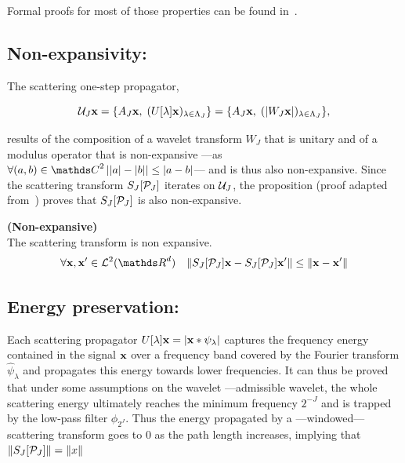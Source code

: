 \documentclass[a4paper,11pt]{report}
\begin{document}
		\begin{note}
		  Formal proofs for most of those properties can be found in~\citep{mallat2012gis}.
		\end{note}

		\subsection{Non-expansivity:}
			\label{subsec:ST/Pties/Non-expansivity}
			The scattering one-step propagator,
			
			\begin{equation*}
			  \mathcal{U}_{J} {\bf x} = \{ A_{J}{\bf x} , \; (U[\lambda]{\bf x})_{\lambda \in \Lambda_{J}} \} = \{ A_{J}{\bf x} , \; (\left| W_{J}{\bf x} \right|)_{\lambda \in \Lambda_{J}} \},
				\label{eq:One step propagator 2}
			\end{equation*}

			results of the composition of a wavelet transform $W_{J}$ that is unitary and of a modulus operator that is non-expansive ---as $\forall (a,b) \in \dsC^{2} \abs{\abs{a}-\abs{b}} \leq \abs{a-b}$--- and is thus also non-expansive. Since the scattering transform $S_{J}[\mathcal{P}_{J}]$ iterates on $\mathcal{U}_{J}$, the proposition (proof adapted from~\citep{lohmiller1998contraction}) proves that $S_{J}[\mathcal{P}_{J}]$ is also non-expansive.
			
			\begin{prop} \textbf{(Non-expansive)}\\ 
				The scattering transform is non expansive.
				\begin{equation}
				  \forall \bfx,\bfx' \in \mcalL^{2}(\dsR^{d}) \;\;\; \norm{S_{J}[\mcalP_{J}]\bfx - S_{J}[\mcalP_{J}]\bfx'} \leq \norm{\bfx-\bfx'}
  			  \label{eq:Nonexpansivity}
				\end{equation}
			  \label{pty:Nonexpansivity}
			\end{prop}

		\subsection{Energy preservation:}
			\label{subsec:ST/Pties/Energy}
			Each scattering propagator $U[\lambda]{\bf x} = \left| {\bf x} \ast \psi_{\lambda} \right|$ captures the frequency energy contained in the signal ${\bf x}$ over a frequency band covered by the Fourier transform $\hat{\psi}_{\lambda}$ and propagates this energy towards lower frequencies. It can thus be proved that under some assumptions on the wavelet ---admissible wavelet, the whole scattering energy ultimately reaches the minimum frequency $2^{-J}$ and is trapped by the low-pass filter $\phi_{2^{J}}$. Thus the energy propagated by a ---windowed--- scattering transform goes to $0$ as the path length increases, implying that $\left\lVert S_{J}[\mathcal{P}_{J}] \right\rVert = \left\lVert x \right\rVert$\\
			
\end{document}
